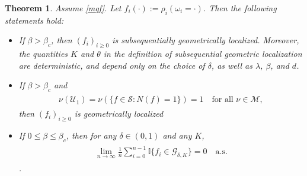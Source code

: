 \documentclass[11pt,reqno]{amsart}
\numberwithin{equation}{section}
\newtheorem{thm}{Theorem}[section]
\theoremstyle{definition}
\begin{document}
\begin{thm} \label{localized_subsequence}
Assume \eqref{mgf}.
Let $f_i(\cdot) := \rho_i(\omega_i = \cdot)$.
Then the following statements hold:
\begin{itemize}
\item[(a)] If $\beta > \beta_c$, then $(f_i)_{i \geq 0}$ is subsequentially geometrically localized. Moreover, the quantities $K$ and $\theta$ in the definition of subsequential geometric localization are deterministic, and depend only on the choice of $\delta$, as well as $\lambda$, $\beta$, and $d$. 
\item[(b)] If $\beta > \beta_c$ and 
{\begin{align} \begin{split} {
\nu({\mathcal{U}}_1) = \nu(\{f \in {\mathcal{S}}: N(f) = 1\}) = 1 \quad \text{for all $\nu \in {\mathcal{M}}$}, \label{single_copy_assumption}
} \end{split} \end{align}}
then $(f_i)_{i \geq 0}$ is geometrically localized
\item[(c)] If $0 \leq \beta \leq \beta_c$, then for any $\delta \in (0,1)$ and any $K$,
{\begin{align} \begin{split} {
\lim_{n \to \infty} \frac{1}{n} \sum_{i = 0}^{n-1} {\mathbb{I}}\{f_i \in {\mathcal{G}}_{\delta,K}\} = 0 \quad \mathrm{a.s.} \label{no_localization}
} \end{split} \end{align}}.
\end{itemize}
\end{thm}
\end{document}
